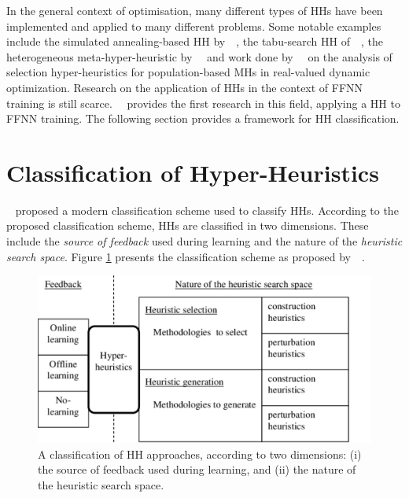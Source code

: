 In the general context of optimisation, many different types of \acp{HH} have been implemented and applied to many different problems. Some notable examples include the simulated annealing-based \acs{HH} by~\citeauthor{ref:dowsland:2007}~\cite{ref:dowsland:2007}, the tabu-search \acs{HH} of~\citeauthor{ref:burke:2010}~\cite{ref:burke:2010}, the heterogeneous meta-hyper-heuristic by~\citeauthor{ref:grobler:2012}~\cite{ref:grobler:2012} and work done by~\citeauthor{ref:vanderstockt:2018}~\cite{ref:vanderstockt:2018} on the analysis of selection hyper-heuristics for population-based \acp{MH} in real-valued dynamic optimization. Research on the application of \acp{HH} in the context of \acs{FFNN} training is still scarce.~\citeauthor{ref:nel:2021}~\cite{ref:nel:2021} provides the first research in this field, applying a \acs{HH} to \acs{FFNN} training. The following section provides a framework for \acs{HH} classification.


\section{Classification of Hyper-Heuristics}\label{sec:hh:classification}

\citeauthor{ref:burke:2010}~\cite{ref:burke:2010} proposed a modern classification scheme used to classify \acp{HH}. According to the proposed classification scheme, \acp{HH} are classified in two dimensions. These include the \textit{source of feedback} used during learning and the nature of the \textit{heuristic search space}. Figure \ref{fig:heuristics:hh:classification} presents the classification scheme as proposed by~\citeauthor{ref:burke:2010}~\cite{ref:burke:2010}.

\begin{figure}[htbp]
      \centering
      \includegraphics[width=\textwidth]{images/hh_classification.pdf}
      \caption{A classification of \acs{HH} approaches, according to two dimensions: (i) the source of feedback used during learning, and (ii) the nature of the heuristic search space.}
      \label{fig:heuristics:hh:classification}
\end{figure}

